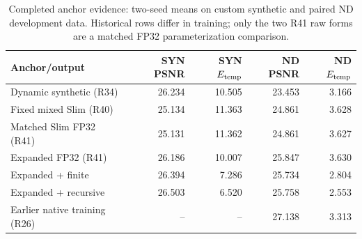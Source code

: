 \begin{table}[t]
\centering\small
\caption{Completed anchor evidence: two-seed means on custom synthetic and paired ND development data. Historical rows differ in training; only the two R41 raw forms are a matched FP32 parameterization comparison.}
\label{tab:anchors}
\begin{tabular}{lrrrr}
\toprule
Anchor/output & SYN PSNR & SYN $E_{\rm temp}$ & ND PSNR & ND $E_{\rm temp}$\\
\midrule
Dynamic synthetic (R34) & 26.234 & 10.505 & 23.453 & 3.166\\
Fixed mixed Slim (R40) & 25.134 & 11.363 & 24.861 & 3.628\\
Matched Slim FP32 (R41) & 25.131 & 11.362 & 24.861 & 3.627\\
Expanded FP32 (R41) & 26.186 & 10.007 & 25.847 & 3.630\\
Expanded + finite & 26.394 & 7.286 & 25.734 & 2.804\\
Expanded + recursive & 26.503 & 6.520 & 25.758 & 2.553\\
Earlier native training (R26) & -- & -- & 27.138 & 3.313\\
\bottomrule
\end{tabular}
\end{table}
